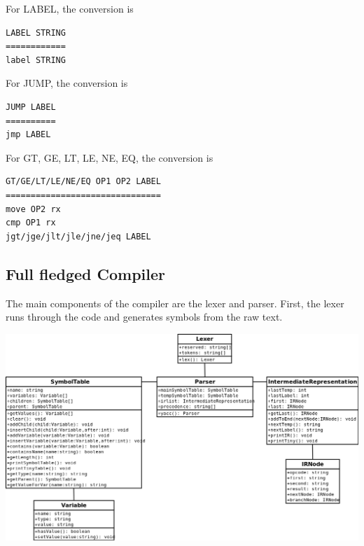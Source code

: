 \documentclass[12pt]{article}
\begin{document}
            For LABEL, the conversion is
            \begin{verbatim}
LABEL STRING
============
label STRING
            \end{verbatim}

            For JUMP, the conversion is
            \begin{verbatim}
JUMP LABEL
==========
jmp LABEL
            \end{verbatim}

            For GT, GE, LT, LE, NE, EQ, the conversion is
            \begin{verbatim}
GT/GE/LT/LE/NE/EQ OP1 OP2 LABEL
===============================
move OP2 rx
cmp OP1 rx
jgt/jge/jlt/jle/jne/jeq LABEL
            \end{verbatim}

    	\subsection{Full fledged Compiler}
            The main components of the compiler are the lexer and parser.
            First, the lexer runs through the code and generates symbols from the raw text.
            \begin{center}
                \includegraphics[width=\linewidth]{uml}
            \end{center}
\end{document}
